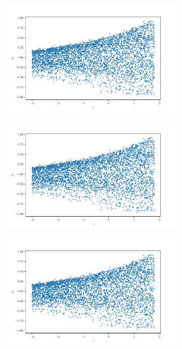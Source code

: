 \documentclass[10pt,a4paper]{article}
\begin{document}
\begin{figure}[!ht]
\begin{subfigure}{0.3\textwidth}
	\caption{}
	\label{cfig_yz2}
\end{subfigure}
\begin{subfigure}{0.3\textwidth}
	\centering
	\includegraphics[width=\textwidth] {cube_trans_z_z2.pdf}
	\caption{}
	\label{cfig_zzo}
\end{subfigure}
\begin{subfigure}{0.3\textwidth}
	\centering	
	\includegraphics[width=\textwidth]{cube_trans_z_z2.pdf}
	\caption{}
	\label{cfig_zz1}
\end{subfigure}
\begin{subfigure}{0.3\textwidth}
	\centering	
	\includegraphics[width=\textwidth]{cube_trans_z_z2.pdf}

\end{subfigure}
\end{figure}
\end{document}
